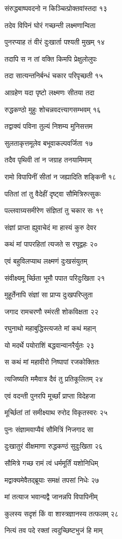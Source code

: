 संरुद्धबाष्पवदनो न किञ्चित्प्रोक्तवांस्तदा १३

तदेव विपिनं घोरं गच्छन्ती लक्ष्मणान्विता

पुनरप्याह तं वीरं दुःखार्ता पश्यती मुखम् १४

तदापि स न तां वक्ति किमपि प्रेक्षुलोलुपः

तदा सात्यन्तनिर्बन्धं चकार परिपृच्छती १५

आग्रहेण यदा पृष्टो लक्ष्मणः सीतया तदा

रुद्धकण्ठो मुहुः शोचन्नवदत्त्यागसम्भवम् १६

तद्वाक्यं पविना तुल्यं निशम्य मुनिसत्तम

सुलताकृत्तमूलेव बभूवाकल्पवर्जिता १७

तदैव पृथिवी तां न जग्राह तनयामिमाम्

रामो विपापिनीं सीतां न जह्यादिति शङ्किनी १८

पतितां तां तु वैदेहीं दृष्ट्वा सौमित्रिरुत्सुकः

पल्लवाग्र्यसमीरेण संज्ञितां तु चकार सः १९

संज्ञां प्राप्ता ह्युवाचेदं मा हास्यं कुरु देवर

कथं मां पापरहितां त्यजते स रघूद्वहः २०

एवं बहुविलप्याथ लक्ष्मणं दुःखसंयुतम्

संवीक्ष्यमू र्च्छिता भूमौ पपात परिदुःखिता २१

मुहूर्तेनापि संज्ञां सा प्राप्य दुःखपरिप्लुता

जगाद रामचरणौ स्मंरती शोकविक्षता २२

रघुनाथो महाबुद्धिस्त्यजते मां कथं महान्

यो मदर्थे पयोराशिं बद्धवान्वानरैर्युतः २३

स कथं मां महावीरो निष्पापां रजकोक्तितः

त्यजिष्यति ममैवात्र दैवं तु प्रतिकूलितम् २४

एवं वदन्ती पुनरपि मूर्च्छां प्राप्ता विदेहजा

मूर्च्छितां तां समीक्ष्याथ रुरोद विकृतस्वरः २५

पुनः संज्ञामवाप्यैवं सौमित्रिं निजगाद सा

दुःखातुरं वीक्षमाणा रुद्धकण्ठं सुदुःखिता २६

सौमित्रे गच्छ रामं त्वं धर्ममूर्तिं यशोनिधिम्

मद्वाक्यमेवैतद्ब्रूयाः समक्षं तपसां निधेः २७

मां तत्याज भवान्यद्वै जानन्नपि विपापिनीम्

कुलस्य सदृशं किं वा शास्त्रज्ञानस्य तत्फलम् २८

नित्यं तव पदे रक्तां त्वदुच्छिष्टभुजं हि माम्

